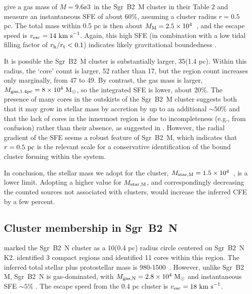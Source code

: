 \documentclass[twocolumn]{aastex62}
\begin{document}

\citet{Schmiedeke2016a} give a gas mass of $M=9.6\ee{3}$~\msun in the Sgr~B2~M
cluster in their Table 2 and measure an instantaneous SFE of about 60\%, assuming
a cluster radius $r=0.5$ pc.  The total mass within 0.5 pc is then about $M_{\rm M} =
2.5\times10^{4}$~\msun, and the escape speed is $v_{\rm esc}=14~\textrm{km~s}^{-1}$. Again, this
high SFE (in combination with a low tidal filling factor of $r_{\rm h}/r_{\rm
t}<0.1$) indicates likely gravitational boundedness
\citep[e.g.][]{Baumgardt2007a,Kruijssen2012b}.



It is possible the Sgr~B2~M cluster is substantially larger, 35\arcsec (1.4 pc).
Within this radius, the `core' count is larger, 52 rather than 17, but the \hii
region count increases only marginally, from 47 to 49.  By contrast,
the gas mass is larger, $M_{\rm gas,1.4pc} = 8\times10^{4}~\mathrm{M}_{\odot}$, so the integrated SFE is lower,
about 20\%.  
The presence of many cores in the outskirts of the Sgr~B2~M cluster suggests
both that it may grow in stellar mass by accretion by up to an additional
$\sim50\%$ and that the lack of cores in the innermost region is due to
incompleteness (e.g., from confusion) rather than their absence, as suggested
in \citet{Ginsburg2018a}. However, the radial gradient of the SFE seems a
robust feature of Sgr~B2~M, which indicates that $r=0.5~\mathrm{pc}$ is the relevant
scale for a conservative identification of the bound cluster forming within the
system.

In conclusion, the stellar mass we adopt for the cluster, $M_{\rm star,M}=1.5\times10^{4}$~\msun, is
a lower limit.  Adopting a higher value for $M_{\rm star,M}$, and correspondingly decreasing
the counted sources not associated with clusters, would increase the inferred
CFE by a few percent.

\subsection{Cluster membership in Sgr~B2~N}
\citet{Schmiedeke2016a} marked the Sgr~B2~N cluster as a 10\arcsec  (0.4 pc) radius circle
centered on Sgr~B2~N K2.  \citet{Schmiedeke2016a} identified 3 compact \hii regions
and \citet{Ginsburg2018a} identified 11 cores within this region.  The inferred
total stellar plus protostellar mass is 980-1500~\msun.  However, unlike Sgr~B2
M, Sgr~B2~N is gas-dominated, with $M_{\rm gas,N} = 2.8\times10^{4}~\mathrm{M}_{\odot}$ and
instantaneous SFE $\sim5\%$ \citep{Schmiedeke2016a}.  The escape speed from the
0.4 pc cluster is
$v_{\rm esc} = 18~\textrm{km~s}^{-1}$.
\end{document}
